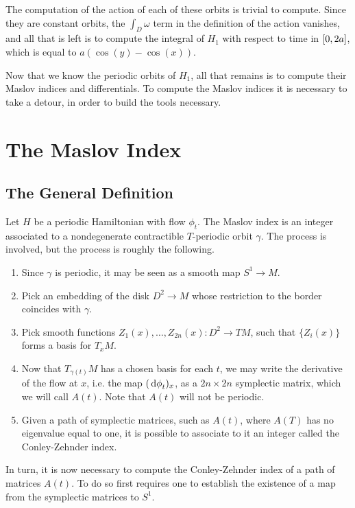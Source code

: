 \documentclass{article}
\theoremstyle{nonumberplain}
\begin{document}
The computation of the action of each of these orbits is trivial to compute. Since they are constant orbits, the $\int_D \omega$ term in the definition of the action vanishes, and all that is left is to compute the integral of $H_1$ with respect to time in $\interval 0 {2a}$, which is equal to $a(\cos(y) - \cos(x))$.

Now that we know the periodic orbits of $H_1$, all that remains is to compute their Maslov indices and differentials. To compute the Maslov indices it is necessary to take a detour, in order to build the tools necessary.

\section{The Maslov Index}

\subsection{The General Definition}

Let $H$ be a periodic Hamiltonian with flow $\phi_t$. The Maslov index is an integer associated to a nondegenerate contractible $T$-periodic orbit $\gamma$. The process is involved, but the process is roughly the following.
\begin{enumerate}[algorithm]
\item Since $\gamma$ is periodic, it may be seen as a smooth map $S^1 \to M$.
\item Pick an embedding of the disk $D^2 \to M$ whose restriction to the border coincides with $\gamma$.
\item Pick smooth functions $Z_1(x), \dots, Z_{2n}(x) \colon D^2 \to TM$, such that $\{Z_i(x)\}$ forms a basis for $T_x M$.
\item Now that $T_{\gamma(t)} M$ has a chosen basis for each $t$, we may write the derivative of the flow at $x$, i.e. the map $(\dl \phi_t)_x$, as a $2n \times 2n$ symplectic matrix, which we will call $A(t)$. Note that $A(t)$ will not be periodic.
\item Given a path of symplectic matrices, such as $A(t)$, where $A(T)$ has no eigenvalue equal to one, it is possible to associate to it an integer called the Conley-Zehnder index.
\end{enumerate}

In turn, it is now necessary to compute the Conley-Zehnder index of a path of matrices $A(t)$. To do so first requires one to establish the existence of a map from the symplectic matrices to $S^1$.
\end{document}
